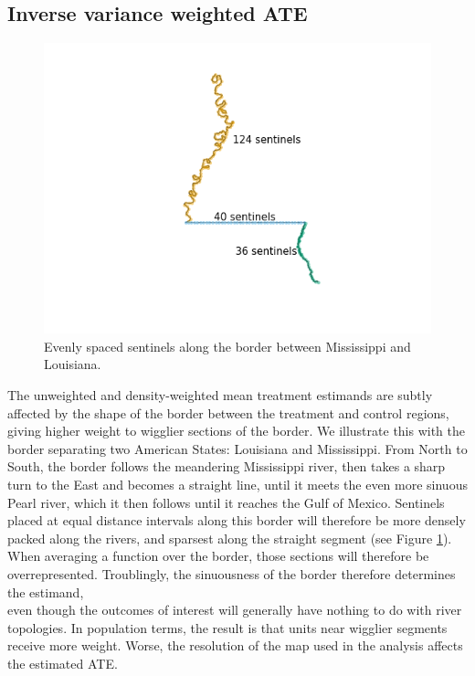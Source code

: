 \documentclass[letter]{article}
\makeatletter
\def\maxwidth{\ifdim\Gin@nat@width>\linewidth\linewidth
\else\Gin@nat@width\fi}
\let\Oldincludegraphics\includegraphics
\renewcommand{\includegraphics}[1]{\Oldincludegraphics[width=.8\maxwidth]{#1}}
\makeatother
\begin{document}
    	\subsection{Inverse variance weighted ATE}\label{inverse-variance-weighted-ate}

\begin{figure}
\centering
\includegraphics{figures/mississippi_counts.png}
\caption{\label{fig:mississippi_counts} Evenly spaced sentinels along the border between Mississippi and Louisiana.}
\end{figure}

The unweighted and density-weighted mean treatment estimands are subtly affected by the shape of the border between the treatment and control regions,
giving higher weight to wigglier sections of the border.
We illustrate this with the border separating two American States: Louisiana and Mississippi.
From North to South, the border follows the meandering Mississippi river, then takes a sharp turn to the East and becomes a straight line, until it meets the even more sinuous Pearl river, which it then follows until it reaches the Gulf of Mexico.
Sentinels placed at equal distance intervals along this border will therefore be more densely packed along the rivers, and sparsest along the straight segment (see Figure \ref{fig:mississippi_counts}).
When averaging a function over the border, those sections will therefore be overrepresented.
Troublingly, the sinuousness of the border therefore determines the estimand,\\
even though the outcomes of interest will generally have nothing to do with river topologies.
In population terms, the result is that units near wigglier segments receive more weight.
Worse, the resolution of the map used in the analysis affects the estimated ATE.
\end{document}
